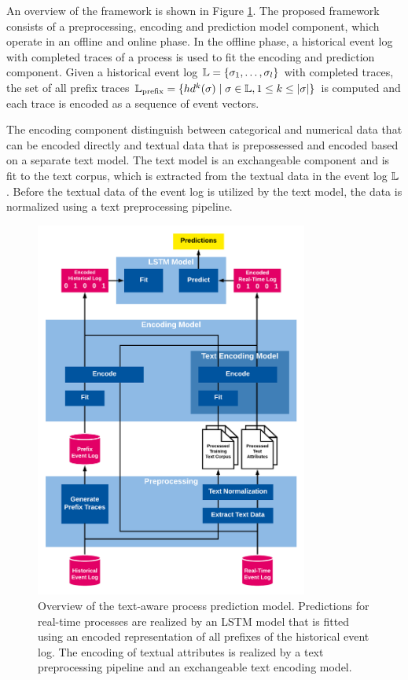 An overview of the framework is shown in Figure \ref{fig:framework}.
The proposed framework consists of a preprocessing, encoding and prediction model component, which operate in an offline and online phase.
In the offline phase, a historical event log with completed traces of a process is used to fit the encoding and prediction component.
Given a historical event log $\mathbb{L} = \{\sigma_1, \dots, \sigma_l\}$ with completed traces, the set of all prefix traces $\mathbb{L}_\mathrm{prefix} = \{ hd^k(\sigma) \mid  \sigma \in \mathbb{L}, 1 \leq k \leq |\sigma|\}$ is computed and each trace is encoded as a sequence of event vectors.

The encoding component distinguish between categorical and numerical data that can be encoded directly and textual data that is prepossessed and encoded based on a separate text model.
The text model is an exchangeable component and is fit to the text corpus, which is extracted from the textual data in the event log $\mathbb{L}$.
Before the textual data of the event log is utilized by the text model, the data is normalized using a text preprocessing pipeline.

\begin{figure}[!htbp]
	\centering
	\includegraphics[width=0.8\textwidth]{figures/framework}
	\caption[Overview of the text-aware process prediction model]{Overview of the text-aware process prediction model. Predictions for real-time processes are realized by an LSTM model that is fitted using an encoded representation of all prefixes of the historical event log. The encoding of textual attributes is realized by a text preprocessing pipeline and an exchangeable text encoding model.}
	\label{fig:framework}
\end{figure}

